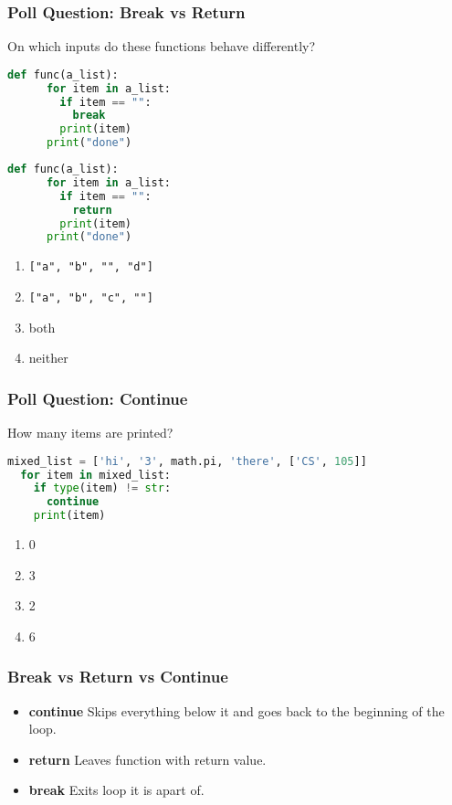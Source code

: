 \documentclass{beamer}
\begin{document}
%
%
\begin{frame}[fragile]
  \frametitle{Poll Question: Break vs Return}
  On which inputs do these functions behave differently?
  \centering
  \begin{minipage}{0.45\textwidth}
    \begin{lstlisting}[language=Python, autogobble]
    def func(a_list):
      for item in a_list:
        if item == "":
          break
        print(item)
      print("done")
    \end{lstlisting}
  \end{minipage}
  \hfill
  \begin{minipage}{0.45\textwidth}
    \begin{lstlisting}[language=Python, autogobble]
    def func(a_list):
      for item in a_list:
        if item == "":
          return 
        print(item)
      print("done")
    \end{lstlisting}
  \end{minipage}
  \vfill
  \begin{enumerate}[A]
    \item \lstinline|["a", "b", "", "d"]|
    \item \lstinline|["a", "b", "c", ""]|
    \item both
    \item neither
  \end{enumerate}
\end{frame}

%
%
\begin{frame}[fragile]
  \frametitle{Poll Question: Continue}
  How many items are printed?
  \begin{lstlisting}[language=Python, autogobble]
  mixed_list = ['hi', '3', math.pi, 'there', ['CS', 105]]
  for item in mixed_list:
    if type(item) != str:
      continue
    print(item)
  \end{lstlisting}
  \vfill
  \begin{enumerate}[A]
    \item 0
    \item 3
    \item 2
    \item 6
  \end{enumerate}
\end{frame}

%
%
\begin{frame}[fragile]
  \frametitle{Break vs Return vs Continue}
  \begin{itemize}
    \item \textbf{continue} \textrightarrow Skips everything below it and goes back to the beginning of the loop.
    \item \textbf{return} \textrightarrow Leaves function with return value.
    \item \textbf{break} \textrightarrow Exits loop it is apart of.
    \end{itemize}
\end{frame}
\end{document}
